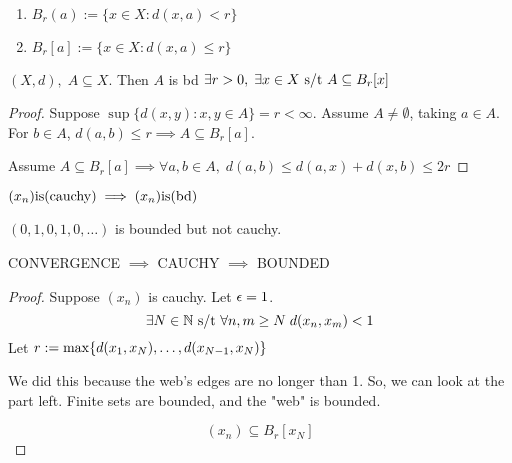 \documentclass[12pt]{article}
\begin{document}
\bboxdefn
\begin{defn}\ \label{defn:open_clsd_balls}
    \begin{enumerate}
        \item {} \(B_r(a):=\{x\in X:d(x,a)<r\}\)
        \item {} \(B_r[a]:=\{x\in X:d(x,a)\le r\}\)
    \end{enumerate}
\end{defn}
\ebox


\bboxprop
\begin{prop}\label{prop:bounded_iff_subset_of_closed_ball}
    \((X,d),\;A\subseteq X\). Then \(A\) is bd 
    \(\exists r>0,\;\exists x\in X\text{ s/t } A\subseteq B_r[x]\)
\end{prop}
\ebox

\bboxproof
\begin{proof}
    Suppose \(\sup\{d(x,y):x,y\in A\}=r<\infty\). Assume \(A\neq\emptyset\), taking \(a\in A\).
    For \(b\in A\), \(d(a,b)\le r\implies A\subseteq B_r[a]\).

    Assume \(A\subseteq B_r[a]\implies\forall a,b\in A,\;
    d(a,b)\le d(a,x)+d(x,b)\le 2r\)
\end{proof}
\ebox

\bboxprop
\begin{prop}\label{prop:cauchy_implies_bounded}
    \((x_n)\mathrm{is}(\mathrm{cauchy})\implies(x_n)\mathrm{is}(\mathrm{bd})\)
\end{prop}
\ebox

\bboxexam
\begin{exam}
    \((0,1,0,1,0,\dots)\) is bounded but not cauchy.
\end{exam}
\ebox

\bboxnote
\begin{note}
    CONVERGENCE \(\implies\) CAUCHY \(\implies\) BOUNDED
\end{note}
\ebox


\bboxproof
\begin{proof}
    Suppose \((x_n)\) is cauchy.
    Let \(\epsilon=1\).
    \[\exists N\in\mathbb N\text{ s/t }
    \forall n,m\ge N\;
    d(x_n,x_m)<1\]
    Let \(r:=\mathrm{max}\{d(x_1,x_N),\dots,d(x_{N-1},x_N)\}\)
    \bboxnote
    \begin{note}
        We did this because the web's edges are no longer than 1. So, we can look at the 
         part left. Finite sets are bounded, and the "web" is bounded.
    \end{note}
    \ebox
    \[(x_n)\subseteq B_r[x_N]\]
\end{proof}
\ebox
\end{document}
